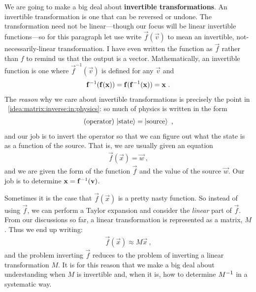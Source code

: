 We are going to make a big deal about \textbf{invertible transformations}. An invertible transformation is one that can be reversed or undone. The transformation need not be linear---though our focus will be linear invertible functions---so for this paragraph let use write $\vec{f}(\vec{v})$ to mean an invertible, not-necessarily-linear transformation. I have even written the function as $\vec{f}$ rather than $f$ to remind us that the output is a vector. Mathematically, an invertible function is one where $\vec{f}^{-1}(\vec{v})$ is defined for any $\vec{v}$ and
\begin{align}
    \mathbf{f}^{-1}(\mathbf{f}(\mathbf{x})) = \mathbf{f}(\mathbf{f}^{-1}(\mathbf{x})) = \mathbf{x} \ .
\end{align}
The \emph{reason} why we care about invertible transformations is precisely the point in \bigidearef~\ref{idea:matrix:inverse:in:physics}: so much of physics is written in the form
\begin{align}
    (\textnormal{operator})\, \left|\textnormal{state}\right\rangle = \left|\textnormal{source}\right\rangle \ ,
\end{align}
and our job is to invert the operator so that we can figure out what the state is as a function of the source. That is, we are usually given an equation
\begin{align}
    \vec{f}(\vec{x}) = \vec{w} \ ,
\end{align}
and we are given the form of the function $\vec{f}$ and the value of the source $\vec{w}$. Our job is to determine $\mathbf{x} = \mathbf{f}^{-1}(\mathbf{v})$. 

Sometimes it is the case that $\vec{f}(\vec{x})$ is a pretty nasty function. So instead of using $\vec{f}$, we can perform a Taylor expansion and consider the \emph{linear} part of $\vec{f}$. From our discussions so far, a linear transformation is represented as a matrix, $M$. Thus we end up writing:
\begin{align}
    \vec{f}(\vec{x}) \approx M\vec{x}  \ ,
\end{align}
and the problem inverting $\vec{f}$ reduces to the problem of inverting a linear transformation $M$. It is for this reason that we make a big deal about understanding when $M$ is invertible and, when it is, how to determine $M^{-1}$ in a systematic way.

